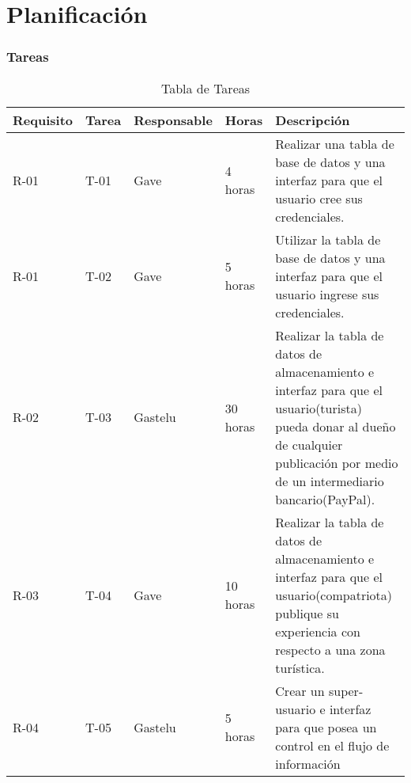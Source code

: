 \chapter{Planificación}
\subsection{Tareas}
\begin{table}[htbp]
	\begin{center}
		\begin{tabular}{| p{1.8cm}| p{1.2cm}| p{2.4cm}|p{2.2cm} |p{7.8cm} |}
			\hline
			\textbf{Requisito} & \textbf{Tarea} & \textbf {Responsable}& \textbf{Horas} & \textbf{Descripción}
			\\\hline  
			R-01&T-01&Gave&4 horas&Realizar una tabla de base de datos y una interfaz para que el usuario cree sus credenciales.
			\\ \hline
			R-01&T-02&Gave&5 horas&Utilizar la tabla de base de datos y una interfaz para que el usuario ingrese sus credenciales.
			\\ \hline
			R-02&T-03&Gastelu&30 horas&Realizar la tabla de datos de almacenamiento e interfaz para que el usuario(turista) pueda donar al dueño de cualquier publicación por medio de un intermediario bancario(PayPal).
			\\ \hline
			R-03&T-04&Gave&10 horas&Realizar la tabla de datos de almacenamiento e interfaz para que el usuario(compatriota) publique su experiencia con respecto a una zona turística.
			\\ \hline
			R-04&T-05&Gastelu&5 horas&Crear un super-usuario e interfaz para que posea un control en el flujo de información 
			\\ \hline	
	\end{tabular}
\caption{Tabla de Tareas}
\end{center}
\end{table}